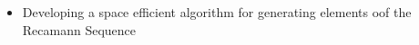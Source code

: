 
\begin{itemize}
    \item Developing a space efficient algorithm for generating elements oof the Recamann Sequence
\end{itemize}